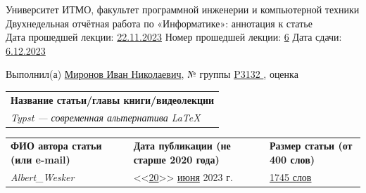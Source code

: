 \documentclass[12pt]{article}
\begin{document}
\begin{center}
\quad Университет ИТМО, факультет программной инженерии и компьютерной техники \\
\quad Двухнедельная отчётная работа по «Информатике»: аннотация к статье\\
\quad Дата прошедшей лекции: \underline{22.11.2023} 	Номер прошедшей лекции: \underline{6}	Дата сдачи: \underline{6.12.2023}

\bigskip

\quad Выполнил(а) \underline{Миронов Иван Николаевич}, № группы \underline{ P3132 }, оценка \underline{\hspace{2cm}}


\end{center}

\begin{tabularx}{\textwidth} { 
  | >{\raggedright\arraybackslash}X|}
    \hline
\textbf{Название статьи/главы книги/видеолекции}\\
    \textit{Typst — современная альтернатива LaTeX}\\
    \hline
\end{tabularx}

\begin{tabularx}{\textwidth} 
{ 
| >{\centering\arraybackslash}X
| >{\centering\arraybackslash}X
| >{\centering\arraybackslash}X 
|}
    \textbf{ФИО автора статьи \quad (или e-mail)} & \textbf{Дата публикации \qquad\qquad (не старше 2020 года)} & \textbf{Размер статьи \qquad\qquad (от 400 слов)} \\
     \textit{Albert\_Wesker} & <<\underline{20}>> \underline{июня} 2023 г. & \underline{1745 слов} \\
    \hline
\end{tabularx}
\end{document}
